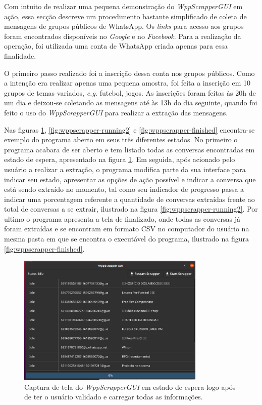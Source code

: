 Com intuito de realizar uma pequena demonstração do \textit{WppScrapperGUI} em ação, essa secção descreve um procedimento bastante simplificado de coleta de mensagens de grupos públicos de WhatsApp. Os \textit{links} para acesso aos grupos foram encontrados disponíveis no \textit{Google} e no \textit{Facebook}. Para a realização da operação, foi utilizada uma conta de WhatsApp criada apenas para essa finalidade.

O primeiro passo realizado foi a inscrição dessa conta nos grupos públicos. Como a intenção era realizar apenas uma pequena amostra, foi feita a inscrição em 10 grupos de temas variados, \textit{e.g.} futebol, jogos. As inscrições foram feitas às 20h de um dia e deixou-se coletando as mensagens até às 13h do dia seguinte, quando foi feito o uso do \textit{WppScrapperGUI} para realizar a extração das mensagens. 

Nas figuras \ref{fig:wppscrapper-idle}, \ref{fig:wppscrapper-running2} e \ref{fig:wppscrapper-finished} encontra-se exemplo do programa aberto em seus três diferentes estados. No primeiro o programa acabara de ser aberto e tem listado todas as conversas encontradas em estado de espera, apresentado na figura \ref{fig:wppscrapper-idle}. Em seguida, após acionado pelo usuário a realizar a extração, o programa modifica parte da sua interface para indicar seu estado, apresentar as opções de ação possível e indicar a conversa que está sendo extraído no momento, tal como seu indicador de progresso passa a indicar uma porcentagem referente a quantidade de conversas extraídas frente ao total de conversas a se extrair, ilustrado na figura \ref{fig:wppscrapper-running2}. Por ultimo o programa apresenta a tela de finalizado, onde todas as conversas já foram extraídas e se encontram em formato CSV no computador do usuário na mesma pasta em que se encontra o executável do programa, ilustrado na figura \ref{fig:wppscrapper-finished}.

\begin{figure}[!htb]
    \centering
    \includegraphics[width=0.8\textwidth]{img/wppscrapper-idle.png}
    \caption{Captura de tela do \textit{WppScrapperGUI} em estado de espera logo após de ter o usuário validado e carregar todas as informações.}
    \label{fig:wppscrapper-idle}
\end{figure}

